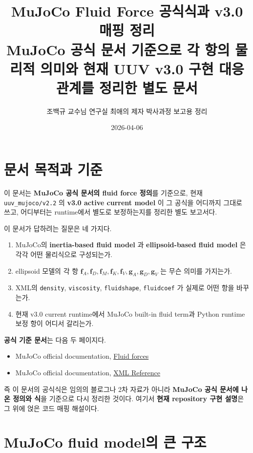 \documentclass[11pt,a4paper]{article}
\title{MuJoCo Fluid Force 공식식과 v3.0 매핑 정리\\
\large MuJoCo 공식 문서 기준으로 각 항의 물리적 의미와 현재 UUV v3.0 구현 대응관계를 정리한 별도 문서}
\author{조백규 교수님 연구실 최애의 제자 박사과정 보고용 정리}
\date{2026-04-06}
\newcommand{\code}[1]{\nolinkurl{#1}}
\begin{document}
\maketitle
\tableofcontents
\clearpage

\section{문서 목적과 기준}

이 문서는 \textbf{MuJoCo 공식 문서의 fluid force 정의}를 기준으로, 현재 \code{uuv\_mujoco/v2.2} 의 \textbf{v3.0 active current model} 이 그 공식을 어디까지 그대로 쓰고, 어디부터는 runtime에서 별도로 보정하는지를 정리한 별도 보고서다.

이 문서가 답하려는 질문은 네 가지다.

\begin{enumerate}[leftmargin=2em]
  \item MuJoCo의 \textbf{inertia-based fluid model} 과 \textbf{ellipsoid-based fluid model} 은 각각 어떤 물리식으로 구성되는가.
  \item ellipsoid 모델의 각 항 \(\mathbf{f}_A, \mathbf{f}_D, \mathbf{f}_M, \mathbf{f}_K, \mathbf{f}_V, \mathbf{g}_A, \mathbf{g}_D, \mathbf{g}_V\) 는 무슨 의미를 가지는가.
  \item XML의 \code{density}, \code{viscosity}, \code{fluidshape}, \code{fluidcoef} 가 실제로 어떤 항을 바꾸는가.
  \item 현재 v3.0 current runtime에서 MuJoCo built-in fluid term과 Python runtime 보정 항이 어디서 갈리는가.
\end{enumerate}

\textbf{공식 기준 문서}는 다음 두 페이지다.

\begin{itemize}[leftmargin=2em]
  \item MuJoCo official documentation, \href{https://mujoco.readthedocs.io/en/3.1.1/computation/fluid.html}{Fluid forces}
  \item MuJoCo official documentation, \href{https://mujoco.readthedocs.io/en/3.1.1/XMLreference.html}{XML Reference}
\end{itemize}

즉 이 문서의 공식식은 임의의 블로그나 2차 자료가 아니라 \textbf{MuJoCo 공식 문서에 나온 정의와 식}을 기준으로 다시 정리한 것이다. 여기서 \textbf{현재 repository 구현 설명}은 그 위에 얹은 코드 매핑 해설이다.

\section{MuJoCo fluid model의 큰 구조}
\end{document}
